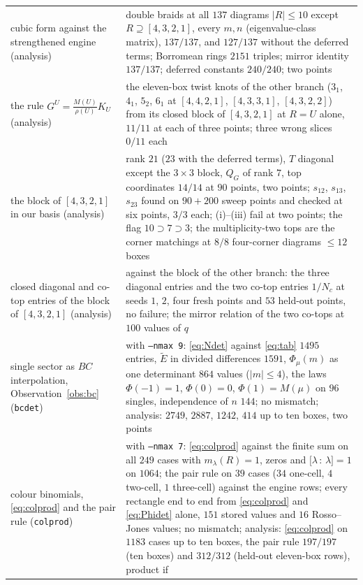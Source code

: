 \documentclass[11pt]{article}
\newcommand{\Et}{\widetilde{E}}
\newcommand{\LMPH}[1]{\texttt{#1}}
\newcommand{\cf}[2]{\bigl[#1\,{:}\,#2\bigr]}
\begin{document}
\begin{longtable}{p{}p{}}
cubic form against the strengthened engine (analysis) & double braids at all $137$ diagrams $|R|\le10$ except $R\supseteq[4,3,2,1]$, every $m,n$ (eigenvalue-class matrix), $137/137$, and $127/137$ without the deferred terms; Borromean rings $2151$ triples; mirror identity $137/137$; deferred constants $240/240$; two points\\
the rule $G^U=\frac{M(U)}{\rho(U)}K_U$ (analysis) & the eleven-box twist knots of the other branch ($3_1$, $4_1$, $5_2$, $6_1$ at $[4,4,2,1]$, $[4,3,3,1]$, $[4,3,2,2]$) from its closed block of $[4,3,2,1]$ at $R=U$ alone, $11/11$ at each of three points; three wrong slices $0/11$ each\\
the block of $[4,3,2,1]$ in our basis (analysis) & rank $21$ ($23$ with the deferred terms), $T$ diagonal except the $3\times3$ block, $Q_G$ of rank $7$, top coordinates $14/14$ at $90$ points, two points; $s_{12}$, $s_{13}$, $s_{23}$ found on $90+200$ sweep points and checked at six points, $3/3$ each; (i)--(iii) fail at two points; the flag $10\supset7\supset3$; the multiplicity-two tops are the corner matchings at $8/8$ four-corner diagrams $\le12$ boxes\\
closed diagonal and co-top entries of the block of $[4,3,2,1]$ (analysis) & against the block of the other branch: the
three diagonal entries and the two co-top entries $1/N_c$ at seeds $1$, $2$, four fresh points and $53$ held-out points, no
failure; the mirror relation of the two co-tops at $100$ values of $q$\\
single sector as $BC$ interpolation, Observation~\ref{obs:bc} (\LMPH{bcdet}) & with \LMPH{--nmax 9}: \eqref{eq:Ndet}
against \eqref{eq:tab} $1495$ entries, $\Et$ in divided differences $1591$, $\Phi_\mu(m)$ as one determinant $864$ values
($|m|\le4$), the laws $\Phi(-1)=1$, $\Phi(0)=0$, $\Phi(1)=M(\mu)$ on $96$ singles, independence of $n$ $144$; no mismatch;
analysis: $2749$, $2887$, $1242$, $414$ up to ten boxes, two points\\
colour binomials, \eqref{eq:colprod} and the pair rule (\LMPH{colprod}) & with \LMPH{--nmax 7}: \eqref{eq:colprod} against the
finite sum on all $249$ cases with $m_\lambda(R)=1$, zeros and $\cf\lambda\lambda=1$ on $1064$; the pair rule on $39$ cases
($34$ one-cell, $4$ two-cell, $1$ three-cell) against the engine rows; every rectangle end to end from \eqref{eq:colprod}
and \eqref{eq:Phidet} alone, $151$ stored values and $16$ Rosso--Jones values; no mismatch; analysis: \eqref{eq:colprod}
on $1183$ cases up to ten boxes, the pair rule $197/197$ (ten boxes) and $312/312$ (held-out eleven-box rows), product if

\end{longtable}
\end{document}
